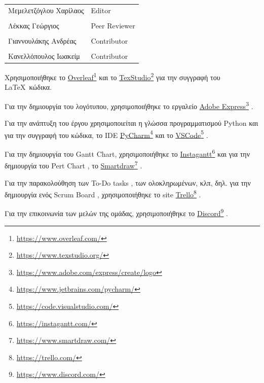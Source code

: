 \documentclass{../ol-softwaremanual}
\newcommand{\doclink}[2]{\href{#1}{#2}\footnote{\url{#1}}}
\begin{document}
	
	\vspace{20pt}
	
	\begin{table}[htbp!]
		\begin{tabular}{ll}
			Μεμελετζόγλου Χαρίλαος & \en Editor \\
			\\ Λέκκας Γεώργιος      &   \en  Peer Reviewer \\
			\\ Γιαννουλάκης Ανδρέας & \en Contributor \\
			\\ Κανελλόπουλος Ιωακείμ & \en Contributor \\ 
		\end{tabular}
	\end{table}
	
	
	\vspace{20pt}
	
	
	\vspace{20pt}
	\flushleft
	Χρησιμοποιήθηκε το \en \doclink{https://www.overleaf.com/}{Overleaf} \gr και το \en \doclink{https://www.texstudio.org/}{TexStudio} \gr για την συγγραφή του \LaTeX\ κώδικα. \break
	
	Για την δημιουργία του λογότυπου, χρησιμοποιήθηκε το εργαλείο \en \doclink{https://www.adobe.com/express/create/logo}{Adobe Express} . \gr \break
	
	Για την ανάπτυξη του έργου χρησιμοποιείται η γλώσσα προγραμματισμού \en Python \gr και για την συγγραφή του κώδικα, το \en IDE \doclink{https://www.jetbrains.com/pycharm/}{PyCharm} \gr και το \en \doclink{https://code.visualstudio.com/}{VSCode} \gr .         \\ \break
	
	Για την δημιουργία του \en Gantt Chart, \gr χρησιμοποιήθηκε το \en \doclink{https://instagantt.com/}{Instagantt}  \gr και για την δημιουργία του \en Pert Chart \gr, το \en \doclink{https://www.smartdraw.com/}{Smartdraw} \gr. \break
	
	Για την παρακολούθηση των \en To-Do tasks \gr, των ολοκληρωμένων, κλπ, δηλ. για την δημιουργία ενός \en Scrum Board \gr, χρησιμοποιήθηκε το \en site \doclink{https://trello.com/}{Trello} \gr. \break 
	
	Για την επικοινωνία των μελών της ομάδας, χρησιμοποιήθηκε το \en \doclink{ https://www.discord.com/}{Discord} \gr . \linebreak 
	
\end{document}
